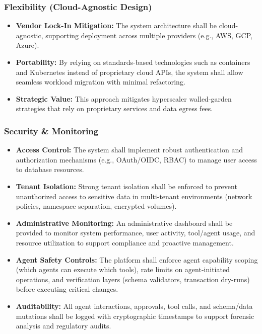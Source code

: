 \subsubsection*{Flexibility (Cloud-Agnostic Design)}
\begin{itemize}
    \item \textbf{Vendor Lock-In Mitigation:} The system architecture shall be cloud-agnostic, supporting deployment across multiple providers (e.g., AWS, GCP, Azure).
    \item \textbf{Portability:} By relying on standards-based technologies such as containers and Kubernetes instead of proprietary cloud APIs, the system shall allow seamless workload migration with minimal refactoring.
    \item \textbf{Strategic Value:} This approach mitigates hyperscaler walled-garden strategies that rely on proprietary services and data egress fees.
\end{itemize}

\subsubsection*{Security \& Monitoring}
\begin{itemize}
    \item \textbf{Access Control:} The system shall implement robust authentication and authorization mechanisms (e.g., OAuth/OIDC, RBAC) to manage user access to database resources.
    \item \textbf{Tenant Isolation:} Strong tenant isolation shall be enforced to prevent unauthorized access to sensitive data in multi-tenant environments (network policies, namespace separation, encrypted volumes).
    \item \textbf{Administrative Monitoring:} An administrative dashboard shall be provided to monitor system performance, user activity, tool/agent usage, and resource utilization to support compliance and proactive management.
    \item \textbf{Agent Safety Controls:} The platform shall enforce agent capability scoping (which agents can execute which tools), rate limits on agent-initiated operations, and verification layers (schema validators, transaction dry-runs) before executing critical changes.
    \item \textbf{Auditability:} All agent interactions, approvals, tool calls, and schema/data mutations shall be logged with cryptographic timestamps to support forensic analysis and regulatory audits.
\end{itemize}
